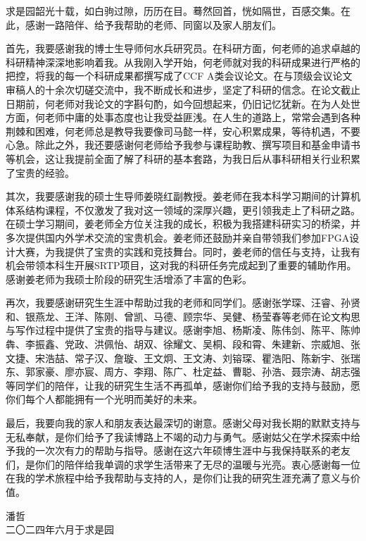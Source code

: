 \cleardoublepage
{}

求是园韶光十载，如白驹过隙，历历在目。蓦然回首，恍如隔世，百感交集。在此，感谢一路陪伴、给予我帮助的老师、同窗以及家人朋友们。

首先，我要感谢我的博士生导师何水兵研究员。在科研方面，何老师的追求卓越的科研精神深深地影响着我。从我刚入学开始，何老师就对我的科研成果进行严格的把控，将我的每一个科研成果都撰写成了CCF A类会议论文。在与顶级会议论文审稿人的十余次切磋交流中，我不断成长和进步，坚定了科研的信念。在论文截止日期前，何老师对我论文的字斟句酌，如今回想起来，仍旧记忆犹新。在为人处世方面，何老师中庸的处事态度也让我受益匪浅。在人生的道路上，常常会遇到各种荆棘和困难，何老师总是教导我要像司马懿一样，安心积累成果，等待机遇，不要心急。除此之外，我还要感谢何老师给予我参与课程助教、撰写项目和基金申请书等机会，这让我提前全面了解了科研的基本套路，为我日后从事科研相关行业积累了宝贵的经验。

其次，我要感谢我的硕士生导师姜晓红副教授。姜老师在我本科学习期间的计算机体系结构课程，不仅激发了我对这一领域的深厚兴趣，更引领我走上了科研之路。在硕士学习期间，姜老师全方位关注我的成长，积极为我搭建科研实习的桥梁，并多次提供国内外学术交流的宝贵机会。姜老师还鼓励并亲自带领我们参加FPGA设计大赛，为我提供了宝贵的实践和竞技舞台。同时，姜老师的信任与支持，让我有机会带领本科生开展SRTP项目，这对我的科研任务完成起到了重要的辅助作用。感谢姜老师为我硕士阶段的研究生活增添了丰富的色彩。

再次，我要感谢研究生生涯中帮助过我的老师和同学们。感谢张学琛、汪睿、孙贤和、银燕龙、王洋、陈刚、曾凯、马德、顾宗华、吴健、杨莹春等老师在论文构思与写作过程中提供了宝贵的指导与建议。感谢李旭、杨斯凌、陈伟剑、陈平、陈帅犇、李振鑫、党政、洪佩怡、胡双、徐耀文、吴桐、段和霄、朱建新、宗威旭、张文捷、宋浩喆、常子汉、詹璇、王文炯、王文涛、刘镕琛、瞿浩阳、陈新宇、张瑞东、郭家豪、廖亦宸、周方、李翔、陈广、杜定益、曹聪、孙浩、聂宗涛、胡志强等同学们的陪伴，让我的研究生生活不再孤单，感谢你们给予我的支持与鼓励，愿你们每个人都能拥有一个光明而美好的未来。

最后，我要向我的家人和朋友表达最深切的谢意。感谢父母对我长期的默默支持与无私奉献，是你们给予了我读博路上不竭的动力与勇气。感谢姑父在学术探索中给予我的一次次有力的帮助与指导。感谢在这六年硕博生涯中与我保持联系的老友们，是你们的陪伴给我单调的求学生活带来了无尽的温暖与光亮。衷心感谢每一位在我的学术旅程中给予我帮助与支持的人，是你们让我的研究生涯充满了意义与价值。



\begin{flushright}
  潘哲\\
  二〇二四年六月于求是园
\end{flushright}